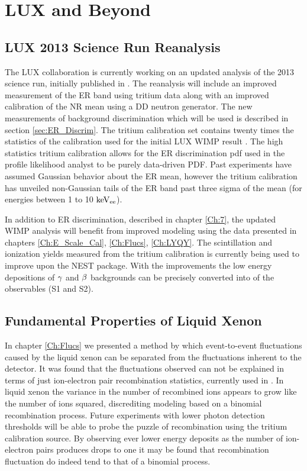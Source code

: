 \renewcommand{\thechapter}{8}

\chapter{LUX and Beyond}
\label{Ch:End}

\section{LUX 2013 Science Run Reanalysis}

The LUX collaboration is currently working on an updated analysis of the 2013 science run, initially published in \cite{LUX_PRL}. The reanalysis will include an improved measurement of the ER band using tritium data along with an improved calibration of the NR mean using a DD neutron generator. The new measurements of background discrimination which will be used is described in section \ref{sec:ER_Discrim}. The tritium calibration set contains twenty times the statistics of the calibration used for the initial LUX WIMP result \cite{LUX_PRL}. The high statistics tritium calibration allows for the ER discrimination pdf used in the profile likelihood analyst to be purely data-driven PDF. Past experiments have assumed Gaussian behavior about the ER mean, however the tritium calibration has unveiled  non-Gaussian tails of the ER band past three sigma of the mean (for energies between 1 to 10 $\rm keV_{ee}$).

In addition to ER discrimination, described in chapter \ref{Ch:7}, the updated WIMP analysis will benefit from improved modeling using the data presented in chapters \ref{Ch:E_Scale_Cal}, \ref{Ch:Flucs}, \ref{Ch:LYQY}. The scintillation and ionization yields measured from the tritium calibration is currently being used to improve upon the NEST package. With the improvements the low energy depositions of $\rm \gamma$ and $\rm \beta$ backgrounds can be precisely converted into of the observables (S1 and S2). 


\section{Fundamental Properties of Liquid Xenon}
In chapter \ref{Ch:Flucs} we presented a method by which event-to-event fluctuations caused by the liquid xenon can be separated from the fluctuations inherent to the detector. It was found that the fluctuations observed can not be explained in terms of just ion-electron pair recombination statistics, currently used in \cite{NEST_2013}. In liquid xenon the variance in the number of recombined ions appears to grow like the number of ions squared, discrediting modeling based on a binomial recombination process. Future experiments with lower photon detection thresholds will be able to probe the puzzle of recombination using the tritium calibration source. By observing ever lower energy deposits as the number of ion-electron pairs produces drops to one it may be found that recombination fluctuation do indeed tend to that of a binomial process.

